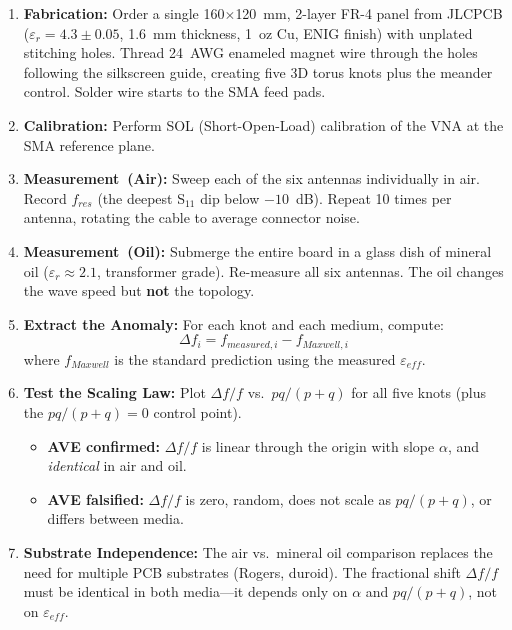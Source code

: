 \begin{enumerate}
    \item \textbf{Fabrication:} Order a single 160$\times$120~mm, 2-layer FR-4 panel from JLCPCB ($\varepsilon_r = 4.3 \pm 0.05$, 1.6~mm thickness, 1~oz Cu, ENIG finish) with unplated stitching holes. Thread 24~AWG enameled magnet wire through the holes following the silkscreen guide, creating five 3D torus knots plus the meander control. Solder wire starts to the SMA feed pads.

    \item \textbf{Calibration:} Perform SOL (Short-Open-Load) calibration of the VNA at the SMA reference plane.

    \item \textbf{Measurement~(Air):} Sweep each of the six antennas individually in air. Record $f_{res}$ (the deepest S$_{11}$ dip below $-10$~dB). Repeat 10 times per antenna, rotating the cable to average connector noise.

    \item \textbf{Measurement~(Oil):} Submerge the entire board in a glass dish of mineral oil ($\varepsilon_r \approx 2.1$, transformer grade). Re-measure all six antennas. The oil changes the wave speed but \textbf{not} the topology.

    \item \textbf{Extract the Anomaly:} For each knot and each medium, compute:
    \begin{equation}
        \Delta f_i = f_{measured,i} - f_{Maxwell,i}
    \end{equation}
    where $f_{Maxwell}$ is the standard prediction using the measured $\varepsilon_{eff}$.

    \item \textbf{Test the Scaling Law:} Plot $\Delta f / f$ vs.\ $pq/(p+q)$ for all five knots (plus the $pq/(p+q)=0$ control point).
    \begin{itemize}
        \item \textbf{AVE confirmed:} $\Delta f/f$ is linear through the origin with slope $\alpha$, and \textit{identical} in air and oil.
        \item \textbf{AVE falsified:} $\Delta f/f$ is zero, random, does not scale as $pq/(p+q)$, or differs between media.
    \end{itemize}

    \item \textbf{Substrate Independence:} The air vs.\ mineral oil comparison replaces the need for multiple PCB substrates (Rogers, duroid). The fractional shift $\Delta f / f$ must be identical in both media---it depends only on $\alpha$ and $pq/(p+q)$, not on $\varepsilon_{eff}$.
\end{enumerate}

